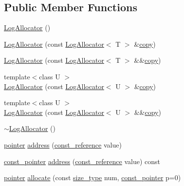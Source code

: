 \subsection*{Public Member Functions}
\begin{DoxyCompactItemize}
\item 
\hyperlink{classprism_1_1_log_allocator_a1aa0da190dd193197fc2e4457a2ed232}{Log\+Allocator} ()
\item 
\hyperlink{classprism_1_1_log_allocator_aad6fef84cfe24f7edb105ea0d79060e4}{Log\+Allocator} (const \hyperlink{classprism_1_1_log_allocator}{Log\+Allocator}$<$ T $>$ \&\hyperlink{namespaceprism_ae776f4cd825f79e7af1cf6ee1d90a209}{copy})
\item 
\hyperlink{classprism_1_1_log_allocator_aab472270873c31327a28b65576357058}{Log\+Allocator} (const \hyperlink{classprism_1_1_log_allocator}{Log\+Allocator}$<$ T $>$ \&\&\hyperlink{namespaceprism_ae776f4cd825f79e7af1cf6ee1d90a209}{copy})
\item 
{\footnotesize template$<$class U $>$ }\\\hyperlink{classprism_1_1_log_allocator_ad2c87f7197db64ef8fe7a4ce09b79fa2}{Log\+Allocator} (const \hyperlink{classprism_1_1_log_allocator}{Log\+Allocator}$<$ U $>$ \&\hyperlink{namespaceprism_ae776f4cd825f79e7af1cf6ee1d90a209}{copy})
\item 
{\footnotesize template$<$class U $>$ }\\\hyperlink{classprism_1_1_log_allocator_aaceeaa1028bf0f4dcce04eb8d75dd7fa}{Log\+Allocator} (const \hyperlink{classprism_1_1_log_allocator}{Log\+Allocator}$<$ U $>$ \&\&\hyperlink{namespaceprism_ae776f4cd825f79e7af1cf6ee1d90a209}{copy})
\item 
\hyperlink{classprism_1_1_log_allocator_a50b58a9885e52f92de2922d6f4711616}{$\sim$\+Log\+Allocator} ()
\item 
\hyperlink{classprism_1_1_log_allocator_aa95e52dd075368ba542af3da925e6c16}{pointer} \hyperlink{classprism_1_1_log_allocator_a95d5386309a042c9617f737dd9ab6ad1}{address} (\hyperlink{classprism_1_1_log_allocator_a8dd85b419a302b7d9cf946726a240a4d}{const\+\_\+reference} value)
\item 
\hyperlink{classprism_1_1_log_allocator_a3533183bc11b2c633d54d7504b515c77}{const\+\_\+pointer} \hyperlink{classprism_1_1_log_allocator_a12cc528e96e60f1e27fbb41afe71a028}{address} (\hyperlink{classprism_1_1_log_allocator_a8dd85b419a302b7d9cf946726a240a4d}{const\+\_\+reference} value) const 
\item 
\hyperlink{classprism_1_1_log_allocator_aa95e52dd075368ba542af3da925e6c16}{pointer} \hyperlink{classprism_1_1_log_allocator_ae4a75cb9f65694e6498b8e8d7fae9ae6}{allocate} (const \hyperlink{classprism_1_1_log_allocator_a23a86945109072959b47b6becda9925f}{size\+\_\+type} num, \hyperlink{classprism_1_1_log_allocator_a3533183bc11b2c633d54d7504b515c77}{const\+\_\+pointer} p=0)

\end{DoxyCompactItemize}
